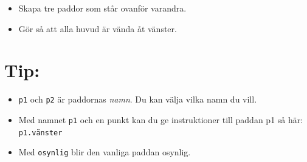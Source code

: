 \begin{itemize}

\item {Skapa tre paddor som står ovanför varandra.}
\item {Gör så att alla huvud är vända åt vänster.}

\end{itemize}


\section*{\color{OliveGreen}Tip:}


\begin{itemize}

\item {\lstinline{p1} och \lstinline{p2} är paddornas {\it namn}. Du kan välja vilka namn du vill.}
\item {Med namnet \lstinline{p1} och en punkt kan du ge instruktioner till paddan p1 så här: \lstinline{p1.vänster}}
\item {Med \lstinline{osynlig} blir den vanliga paddan osynlig.}

\end{itemize}


